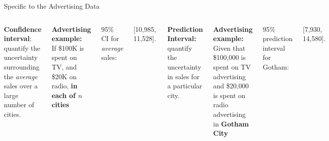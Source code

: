 \documentclass[aspectratio=169,usenames,dvipsnames]{beamer}
\newcommand{\InstructorNotes}[1]{\textit{\color{orange}#1}}
\renewcommand{\InstructorNotes}[1]{}
\begin{document}
\begin{frame}[t]{Specific to the Advertising Data}

	
	\begin{columns}
	\textbf{Confidence interval}: 
	quantify the uncertainty surrounding the \emph{average} sales over a large number of cities.
	
	
	
	\qquad
	
	\textbf{Advertising example:} \\
	If \$100K is spent on TV, and \$20K on radio, {\color{red}\textbf{in each of $n$ cities}} 
	
	\qquad 

	95\% CI for \emph{average} sales: 
	
	[10,985,\, 11,528].

	\tiny
	 \InstructorNotes{
	  Interpretation: if we collect a large number of data sets like the Advertising data
	 set, and we construct a confidence interval for the average sales on the basis of each
	 data set (given \$100,000 in TV and \$20,000 in radio advertising), then 95 \% of these 	 confidence intervals will contain the true value of average sales.
	 }
	
	
	\textbf{Prediction Interval:}
	quantify the uncertainty in sales for a particular city.
	
	\qquad
	
	\textbf{Advertising example:} \\
	Given that \$100,000 is spent on TV advertising and \$20,000 is spent on radio advertising in {\color{red}\textbf{Gotham City}}\\

	\qquad 

	95\% prediction interval for Gotham:  

	  [7,930, 14,580].
	
	\InstructorNotes{We interpret this to mean that 95\% of intervals of this form will contain the true value of Y for this city.}
	
	\end{columns}
	\end{frame}
\end{document}
